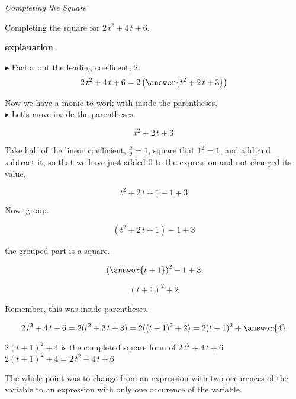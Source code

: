 \documentclass{ximera}
\begin{document}
\begin{example} \textit{Completing the Square}



Completing the square for $2 \, t^2 + 4 \, t + 6$.


\textbf{explanation}

$\blacktriangleright$ Factor out the leading coefficent, $2$.\\

\[     2 \, t^2 + 4 \, t + 6 = 2 \left( \answer{t^2 + 2 \, t + 3} \right)   \] 


Now we have a monic to work with inside the parentheses. \\


$\blacktriangleright$ Let's move inside the parentheses.

\[ t^2 + 2 \, t + 3 \]

Take half of the linear coefficient, $\frac{2}{2} = 1$, square that $1^2 = 1$, and add and subtract it, so that we have just added $0$ to the expression and not changed its value.


\[ t^2 + 2 \, t + 1 - 1 +3 \]


Now, group.

\[ (t^2 + 2 \, t + 1) - 1 + 3 \]

the grouped part is a square.

\[ \left( \answer{t+1} \right)^2 - 1 + 3 \]

\[ (t+1)^2 + 2 \]

Remember, this was inside parentheses.

\[     2 \, t^2 + 4 \, t + 6 = 2 (t^2 + 2 \, t + 3)  = 2 ((t+1)^2 + 2) =  2 (t+1)^2 + \answer{4}\] 


$2 (t+1)^2 + 4$ is the completed square form of $2 \, t^2 + 4 \, t + 6$ \\


$2 (t+1)^2 + 4 = 2 \, t^2 + 4 \, t + 6$





\end{example}














The whole point was to change from an expression with two occurences of the variable to an expression with only one occurence of the variable. \\
\end{document}

